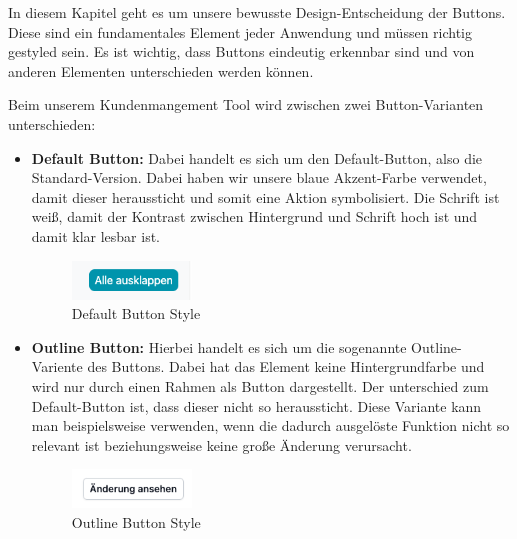 In diesem Kapitel geht es um unsere bewusste Design-Entscheidung der Buttons. Diese sind ein fundamentales Element jeder Anwendung und müssen richtig gestyled sein. Es ist wichtig, dass Buttons eindeutig erkennbar sind und von anderen Elementen unterschieden werden können.

Beim unserem Kundenmangement Tool wird zwischen zwei Button-Varianten unterschieden:

\begin{itemize}
    \item \textbf{Default Button:}
        \newline
        Dabei handelt es sich um den Default-Button, also die Standard-Version. Dabei haben wir unsere blaue Akzent-Farbe verwendet, damit dieser heraussticht und somit eine Aktion symbolisiert. Die Schrift ist weiß, damit der Kontrast zwischen Hintergrund und Schrift hoch ist und damit klar lesbar ist.
        \begin{figure}[h!]
            \centering
            \includegraphics[width=0.3\textwidth]{pics/button-default.png}
            \caption{Default Button Style}
            \label{fig:mesh1}
        \end{figure}
\newpage
    \item \textbf{Outline Button:}
        \newline
        Hierbei handelt es sich um die sogenannte Outline-Variente des Buttons. Dabei hat das Element keine Hintergrundfarbe und wird nur durch einen Rahmen als Button dargestellt. Der unterschied zum Default-Button ist, dass dieser nicht so heraussticht. Diese Variante kann man beispielsweise verwenden, wenn die dadurch ausgelöste Funktion nicht so relevant ist beziehungsweise keine große Änderung verursacht.
        \begin{figure}[h!]
            \centering
            \includegraphics[width=0.3\textwidth]{pics/button-outline.png}
            \caption{Outline Button Style}
            \label{fig:mesh1}
        \end{figure}
\end{itemize}